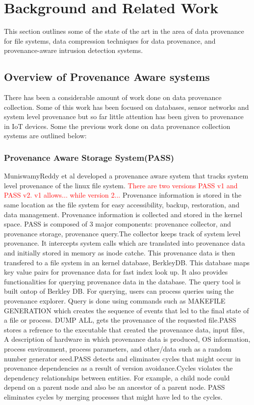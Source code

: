 
\chapter{Background and Related Work}\label{background}

This section outlines some of the state of the art in the area of data provenance for file systems, data compression techniques for data provenance, and provenance-aware intrusion detection systems.

\section{Overview of Provenance Aware systems}

There has been a considerable amount of work done on data provenance collection. Some of this work has been focused on databases, sensor networks and system level provenance but so far little attention has been given to provenance in IoT devices. Some the previous work done on data provenance collection systems are outlined below:

\subsection{Provenance Aware Storage System(PASS)}
MuniswamyReddy
et al developed a provenance aware system that tracks  system level provenance of the linux file system.\textcolor{red}{ There are two versions PASS v1 and PASS v2. v1 allows... while version 2...} Provenance information
is stored in the same location as the file system for easy accessibility, backup,
restoration, and data management. Provenance information is collected and stored in
the kernel space. PASS is composed of 3 major components: provenance collector, and provenance storage, provenance query.The collector keeps track of system level provenance. It intercepts system calls which are translated into provenance data and initially stored in memory as inode catche. This provenance data is then transfered to a file system in an kernel database, BerkleyDB. This database maps key value pairs for provenance data for fast index look up. It also provides functionalities for querying provenance data in the database. The query tool is built ontop of Berkley DB. For querying, users can process queries using the provenance explorer. Query is done using commands such as MAKEFILE  GENERATION which creates the sequence of events that led to the final state of a file or process. DUMP ALL, gets the provenance of the requested file.PASS stores a refrence to the executable that created the provenance data, input files, A description of hardware in which provenance data is produced, OS information, process environment, process parameters, and other/data such as a random number generator seed.PASS detects and eliminates cycles that might occur in provenance dependencies as a result of version avoidance.Cycles violates the dependency relationships between entities. For example, a child node could depend on a parent node and also be an ancestor of a parent node. PASS eliminates cycles by merging processes that might have led to the cycles. 

